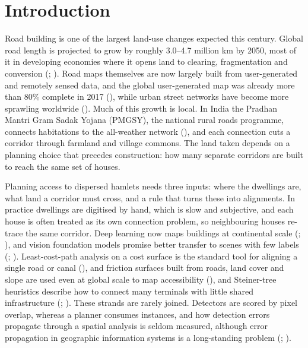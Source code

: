 
\section{Introduction}
Road building is one of the largest land-use changes expected this century. Global road length is projected to grow by roughly 3.0--4.7 million km by 2050, most of it in developing economies where it opens land to clearing, fragmentation and conversion (\citealt{meijer2018global}; \citealt{laurance2014global}). Road maps themselves are now largely built from user-generated and remotely sensed data, and the global user-generated map was already more than 80\% complete in 2017 (\citealt{barrington2017roadmap}), while urban street networks have become more sprawling worldwide (\citealt{barrington2020sprawl}). Much of this growth is local. In India the Pradhan Mantri Gram Sadak Yojana (PMGSY), the national rural roads programme, connects habitations to the all-weather network (\citealt{pmgsy}), and each connection cuts a corridor through farmland and village commons. The land taken depends on a planning choice that precedes construction: how many separate corridors are built to reach the same set of houses.

Planning access to dispersed hamlets needs three inputs: where the dwellings are, what land a corridor must cross, and a rule that turns these into alignments. In practice dwellings are digitised by hand, which is slow and subjective, and each house is often treated as its own connection problem, so neighbouring houses re-trace the same corridor. Deep learning now maps buildings at continental scale (\citealt{ji2019whu}; \citealt{sirko2021openbuildings}), and vision foundation models promise better transfer to scenes with few labels (\citealt{oquab2023dinov2}; \citealt{cong2022satmae}). Least-cost-path analysis on a cost surface is the standard tool for aligning a single road or canal (\citealt{collischonn2000lcp}), and friction surfaces built from roads, land cover and slope are used even at global scale to map accessibility (\citealt{weiss2018accessibility}), and Steiner-tree heuristics describe how to connect many terminals with little shared infrastructure (\citealt{kou1981steiner}; \citealt{hwang1992steiner}). These strands are rarely joined. Detectors are scored by pixel overlap, whereas a planner consumes instances, and how detection errors propagate through a spatial analysis is seldom measured, although error propagation in geographic information systems is a long-standing problem (\citealt{heuvelink1998error}; \citealt{foody2002status}).

